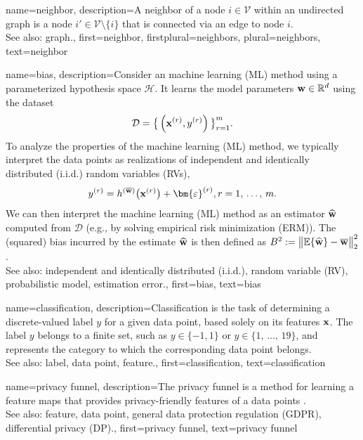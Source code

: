 {
{name={neighbor},
	description={A neighbor of a node $i \in \mathcal{V}$ 
		within an undirected graph is a node $i' \in \mathcal{V} \setminus \{ i\}$ 
		that is connected via an edge to node $i$.
				\\ 
		See also: graph.},
	first={neighbor},
	firstplural={neighbors}, 
	plural={neighbors}, 
	text={neighbor} 
}

{name={bias},
	description={Consider an machine learning (ML) method using a parameterized hypothesis space $\mathcal{H}$. 
		It learns the model parameters ${\bf w} \in \mathbb{R}^{d}$ using the dataset 
		$$\mathcal{D}=\big\{ \left( {\bf x}^{(r)},y^{(r)} \right) \big\}_{r=1}^{m}.$$ 
		To analyze the properties of the machine learning (ML) method, we typically interpret the data points as realizations of independent and identically distributed (i.i.d.) random variables (RVs), 
		$$y^{(r)} = h^{(\overline{{\bf w}})}\big( {\bf x}^{(r)} \big) + \bm{\varepsilon}^{(r)}, r=1, \,\ldots, \,m.$$ 
		We can then interpret the machine learning (ML) method as an estimator $\widehat{{\bf w}}$ 
		computed from $\mathcal{D}$ (e.g., by solving empirical risk minimization (ERM)). The (squared) bias incurred by 
		the estimate $\widehat{{\bf w}}$ is then defined as $B^{2} := \big\| \mathbb{E}  \{ \widehat{{\bf w}}  \}- \overline{{\bf w}}\big\|_{2}^{2}$.
					\\ 
		See also: independent and identically distributed (i.i.d.), random variable (RV), probabilistic model, estimation error.},
	first={bias},
	text={bias} 
}

{name={classification},
	description={Classification is the task of determining a 
 		discrete-valued label $y$ for a given data point, based solely on its 
 		features ${\bf x}$. The label $y$ belongs to a finite set, such as 
 		$y \in \{-1,1\}$ or $y \in \{1, \,\ldots, \,19\}$, and represents the 
 		category to which the corresponding data point belongs.
				\\ 
		See also: label, data point, feature.},
	first={classification},
	text={classification} 
}


{name={privacy funnel},
	description={The privacy funnel is a method for learning 
	a feature maps that provides privacy-friendly features of a 
	data points \cite{PrivacyFunnel}.
				\\ 
		See also: feature, data point, general data protection regulation (GDPR), differential privacy (DP).},
 	first={privacy funnel},
	text={privacy funnel} 
}


}
